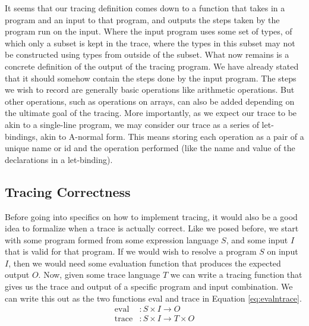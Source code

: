     It seems that our tracing definition comes down to a function that takes in a program and an input to that program, and outputs the steps taken by the program run on the input.
    Where the input program uses some set of types, of which only a subset is kept in the trace, where the types in this subset may not be constructed using types from outside of the subset.
    What now remains is a concrete definition of the output of the tracing program.
    We have already stated that it should somehow contain the steps done by the input program.
    The steps we wish to record are generally basic operations like arithmetic operations.
    But other operations, such as operations on arrays, can also be added depending on the ultimate goal of the tracing.
    More importantly, as we expect our trace to be akin to a single-line program, we may consider our trace as a series of let-bindings, akin to A-normal form.
    This means storing each operation as a pair of a unique name or id and the operation performed (like the name and value of the declarations in a let-binding).
    
    \subsection{Tracing Correctness} \label{sec:correctness}
        Before going into specifics on how to implement tracing, it would also be a good idea to formalize when a trace is actually correct.
        Like we posed before, we start with some program formed from some expression language $S$, and some input $I$ that is valid for that program.
        If we would wish to resolve a program $S$ on input $I$, then we would need some evaluation function that produces the expected output $O$.
        Now, given some trace language $T$ we can write a tracing function that gives us the trace and output of a specific program and input combination.
        We can write this out as the two functions eval and trace in Equation \ref{eq:evalntrace}.
        \begin{equation}
            \begin{aligned}
                \text{eval}&:S\times I\to O\\
                \text{trace}&:S\times I\to T\times O
            \end{aligned}
            \label{eq:evalntrace}
        \end{equation}

